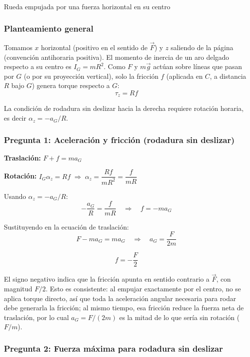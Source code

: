 \begin{solucion}{Rueda empujada por una fuerza horizontal en su centro}
\subsubsection*{Planteamiento general}

Tomamos $x$ horizontal (positivo en el sentido de $\vec{F}$) y $z$ saliendo de la página (convención antihoraria positiva). El momento de inercia de un aro delgado respecto a su centro es $I_G = mR^2$. Como $F$ y $m\vec{g}$ actúan sobre líneas que pasan por $G$ (o por su proyección vertical), solo la fricción $f$ (aplicada en $C$, a distancia $R$ bajo $G$) genera torque respecto a $G$:
$$\tau_z = R f$$

La condición de rodadura sin deslizar hacia la derecha requiere rotación horaria, es decir $\alpha_z = -a_G/R$.

\subsubsection*{Pregunta 1: Aceleración y fricción (rodadura sin deslizar)}

\textbf{Traslación:} $F + f = ma_G$

\textbf{Rotación:} $I_G\alpha_z = Rf \;\Rightarrow\; \alpha_z = \dfrac{Rf}{mR^2} = \dfrac{f}{mR}$

Usando $\alpha_z = -a_G/R$:
$$-\frac{a_G}{R} = \frac{f}{mR} \quad\Rightarrow\quad f = -ma_G$$

Sustituyendo en la ecuación de traslación:
$$F - ma_G = ma_G \quad\Rightarrow\quad \boxed{a_G = \frac{F}{2m}}$$

$$\boxed{f = -\frac{F}{2}}$$

El signo negativo indica que la fricción apunta en sentido contrario a $\vec{F}$, con magnitud $F/2$. Esto es consistente: al empujar exactamente por el centro, no se aplica torque directo, así que toda la aceleración angular necesaria para rodar debe generarla la fricción; al mismo tiempo, esa fricción reduce la fuerza neta de traslación, por lo cual $a_G = F/(2m)$ es la mitad de lo que sería sin rotación ($F/m$).

\subsubsection*{Pregunta 2: Fuerza máxima para rodadura sin deslizar}


\end{solucion}
